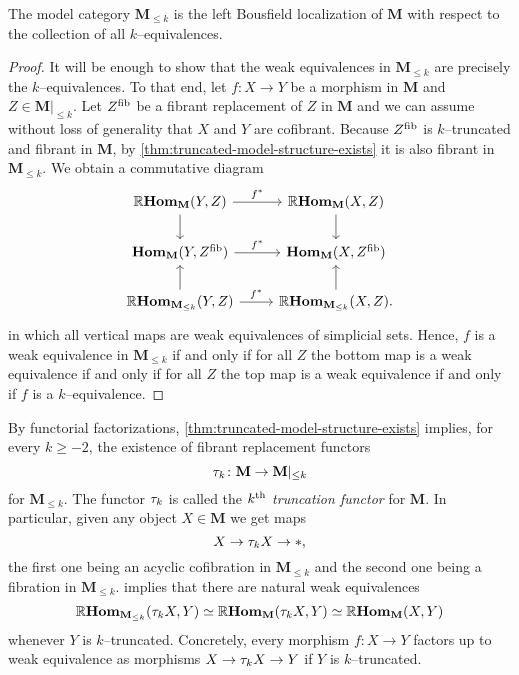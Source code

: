 \begin{corollary}\label{cor:weak-equiv-level}
  The model category \(\mathbf M_{\leq k}\) is the left Bousfield localization of \(\mathbf M\) with respect to the collection of all \(k\)--equivalences.
\end{corollary}
\begin{proof}
  It will be enough to show that the weak equivalences in \(\mathbf M_{\leq k}\) are precisely the \(k\)--equivalences. To that end, let \(f\colon X\to Y\) be a morphism in \(\mathbf M\) and \(Z\in\mathbf M|_{\leq k}\). Let \(Z^{\operatorname{\textnormal{fib}}}\) be a fibrant replacement of \(Z\) in \(\mathbf M\) and we can assume without loss of generality that \(X\) and \(Y\) are cofibrant. Because \(Z^{\operatorname{\textnormal{fib}}}\) is \(k\)--truncated and fibrant in \(\mathbf M\), by \autoref{thm:truncated-model-structure-exists} it is also fibrant in \(\mathbf M_{\leq k}\). We obtain a commutative diagram
  \[
  \begin{tikzcd}
    \RHom_{\mathbf M}(Y, Z) \arrow[r, "f^{*}"] \arrow[d] & \RHom_{\mathbf M}(X, Z) \arrow[d] \\
    \Hom_{\mathbf M}(Y, Z^{\fib}) \arrow[r, "f^{*}"] & \Hom_{\mathbf M}(X, Z^{\fib}) \\
    \RHom_{\mathbf M_{\leq k}}(Y, Z) \arrow[r, "f^{*}"] \arrow[u] & \RHom_{\mathbf M_{\leq k}}(X, Z). \arrow[u]
  \end{tikzcd}
  \]
  in which all vertical maps are weak equivalences of simplicial sets. Hence, \(f\) is a weak equivalence in \(\mathbf M_{\leq k}\) if and only if for all \(Z\) the bottom map is a weak equivalence if and only if for all \(Z\) the top map is a weak equivalence if and only if \(f\) is a \(k\)--equivalence.
\end{proof}

By functorial factorizations, \autoref{thm:truncated-model-structure-exists} implies, for every \(k\geq -2\), the existence of fibrant replacement functors
\[\tau_{k}\colon \mathbf{M}\to\mathbf{M}|_{\leq k}\]
for \(\mathbf M_{\leq k}\). The functor \(\tau_{k}\) is called the \emph{\(k\textsuperscript{th}\) truncation functor} for \(\mathbf{M}\). In particular, given any object \(X\in\mathbf{M}\) we get maps
\[X\to \tau_{k} X\to *,\]
the first one being an acyclic cofibration in \(\mathbf{M}_{\leq k}\) and the second one being a fibration in \(\mathbf{M}_{\leq k}\).  implies that there are natural weak equivalences
\[\operatorname{\mathbb{R}\textnormal{\bfseries Hom}}_{\mathbf M_{\leq k}}(\tau_{k} X, Y)\simeq \operatorname{\mathbb{R}\textnormal{\bfseries Hom}}_{\mathbf M}(\tau_{k} X, Y) \simeq \operatorname{\mathbb{R}\textnormal{\bfseries Hom}}_{\mathbf M}(X, Y)\]
whenever \(Y\) is \(k\)--truncated. Concretely, every morphism \(f\colon X\to Y\) factors up to weak equivalence as morphisms \(X\to \tau_{k}X\to Y\) if \(Y\) is \(k\)--truncated.

